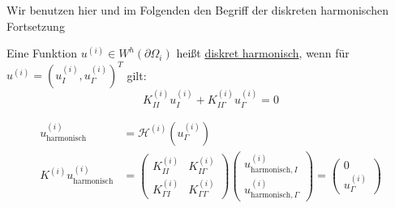 Wir benutzen hier und im Folgenden den Begriff der diskreten harmonischen Fortsetzung

\begin{definition}
  Eine Funktion $u^{(i)}\in W^h(\partial\Omega_i)$ heißt \underline{diskret harmonisch}, wenn für $u^{(i)}=(u_I^{(i)},u_\Gamma^{(i)})^T$ gilt:
  \[
    K_{II}^{(i)}u_I^{(i)}+K_{I\Gamma}^{(i)}u_\Gamma^{(i)} = 0 
  \]

  \begin{align*}
    u^{(i)}_{\text{harmonisch}} &= \mathcal{H}^{(i)}(u_{\Gamma}^{(i)})\\
    K^{(i)}u_{\text{harmonisch}}^{(i)} &= 
    \begin{pmatrix}
      K_{II}^{(i)} & K_{I\Gamma}^{(i)}\\
      K_{\Gamma I}^{(i)} & K_{\Gamma\Gamma}^{(i)}
    \end{pmatrix}
    \begin{pmatrix}
      u_{\text{harmonisch},I}^{(i)}\\
      u_{\text{harmonisch},\Gamma}^{(i)}
    \end{pmatrix}
    =
    \begin{pmatrix}
      0\\
      u_{\Gamma}^{(i)}
    \end{pmatrix}
  \end{align*}
\end{definition}

